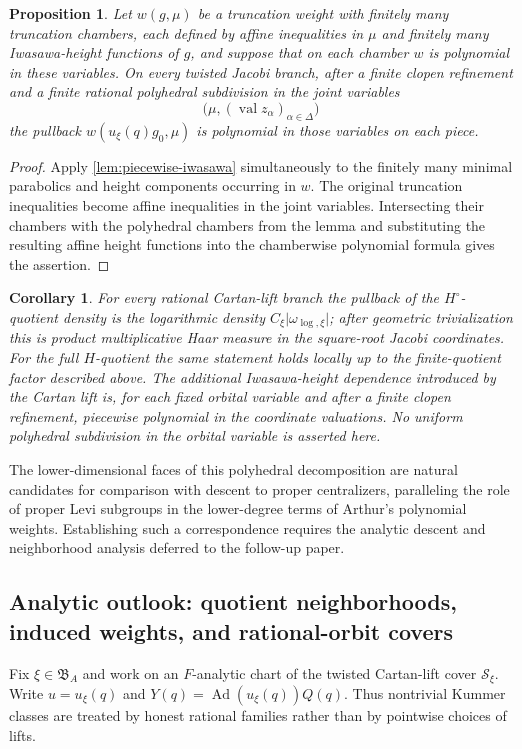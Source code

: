 \documentclass[11pt]{amsart}
\newtheorem{proposition}[proposition]{Proposition}
\newtheorem{corollary}[corollary]{Corollary}
\theoremstyle{definition}
\theoremstyle{remark}
\newcommand{\cS}{\mathcal S}
\newcommand{\Ad}{\operatorname{Ad}}
\newcommand{\val}{\operatorname{val}}
\newcommand{\abs}[1]{\lvert #1\rvert}
\begin{document}
\begin{proposition}\label{prop:toroidal-weights}
Let $w(g,\mu)$ be a truncation weight with finitely many truncation chambers,
each defined by affine inequalities in $\mu$ and finitely many Iwasawa-height
functions of $g$, and suppose that on each chamber $w$ is polynomial in these
variables.
On every twisted Jacobi branch, after a finite clopen refinement and a finite
rational polyhedral subdivision in the joint variables
\[
 \bigl(\mu,(\val z_\alpha)_{\alpha\in\Delta}\bigr)
\]
the pullback $w(u_\xi(q)g_0,\mu)$ is polynomial in those variables on each
piece.
\end{proposition}

\begin{proof}
Apply \cref{lem:piecewise-iwasawa} simultaneously to the finitely many
minimal parabolics and height components occurring in $w$.  The original
truncation inequalities become affine inequalities in the joint variables.
Intersecting their chambers with the polyhedral chambers from the lemma and
substituting the resulting affine height functions into the chamberwise
polynomial formula gives the assertion.
\end{proof}

\begin{corollary}\label{cor:weighted-mechanism}
For every rational Cartan-lift branch the pullback of the
$H^\circ$-quotient density is the logarithmic density
$C_\xi\abs{\omega_{\log,\xi}}$; after geometric trivialization this is product
multiplicative Haar measure in the square-root Jacobi coordinates.  For the
full $H$-quotient the same statement holds locally up to the finite-quotient
factor described above.  The additional Iwasawa-height dependence introduced
by the Cartan lift is, for each fixed orbital variable and after a finite
clopen refinement, piecewise polynomial in the coordinate valuations.  No
uniform polyhedral subdivision in the orbital variable is asserted here.
\end{corollary}

The lower-dimensional faces of this polyhedral decomposition are natural
candidates for comparison with descent to proper centralizers, paralleling the
role of proper Levi subgroups in the lower-degree terms of Arthur's polynomial
weights.  Establishing such a correspondence requires the analytic descent
and neighborhood analysis deferred to the follow-up paper.

\subsection{Analytic outlook: quotient neighborhoods, induced weights, and rational-orbit covers}
Fix $\xi\in\mathfrak B_A$ and work on an $F$-analytic chart of the twisted
Cartan-lift cover $\cS_\xi$.  Write $u=u_\xi(q)$ and
$Y(q)=\Ad(u_\xi(q))Q(q)$.  Thus nontrivial Kummer classes are treated by
honest rational families rather than by pointwise choices of lifts.
\end{document}
